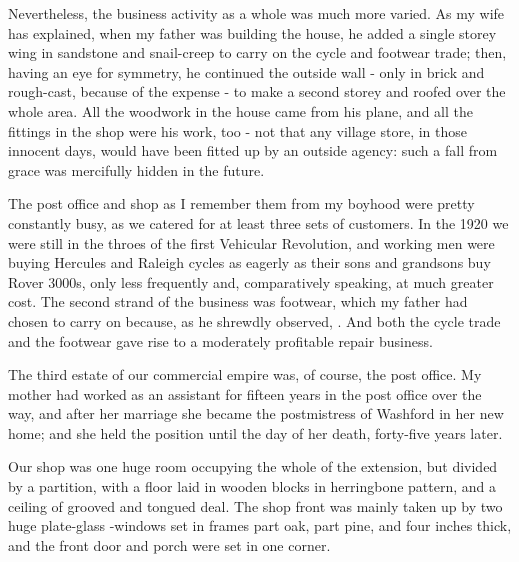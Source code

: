 Nevertheless, the business activity as a whole was much more varied. As my wife has explained, when my father was building the house, he added a single storey wing in sandstone and snail-creep to carry on the cycle and footwear trade; then, having an eye for symmetry, he continued the outside wall - only in brick and rough-cast, because of the expense - to make a second storey and roofed over the whole area. All the woodwork in the house came from his plane, and all the fittings in the shop were his work, too - not that any village store, in those innocent days, would have been fitted up by an outside agency: such a fall from grace was mercifully hidden in the future.

The post office and shop as I remember them from my boyhood were pretty constantly busy, as we catered for at least three sets of customers. In the 1920 we were still in the throes of the first Vehicular Revolution, and working men were buying Hercules and Raleigh cycles as eagerly as their sons and grandsons buy Rover 3000s, only less frequently and, comparatively speaking, at much greater cost. The second strand of the business was footwear, which my father had chosen to carry on because, as he shrewdly observed, . And both the cycle trade and the footwear gave rise to a moderately profitable repair business.

The third estate of our commercial empire was, of course, the post office. My mother had worked as an assistant for fifteen years in the post office over the way, and after her marriage she became the postmistress of Washford in her new home; and she held the position until the day of her death, forty-five years later.

Our shop was one huge room occupying the whole of the extension, but divided by a partition, with a floor laid in wooden blocks in herringbone pattern, and a ceiling of grooved and tongued deal. The shop front was mainly taken up by two huge plate-glass -windows set in frames part oak, part pine, and four inches thick, and the front door and porch were set in one corner.

